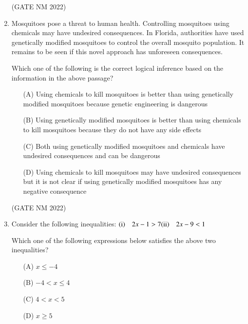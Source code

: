\documentclass[journal,12pt,onecolumn]{IEEEtran}
\theoremstyle{remark}
\begin{document}
\begin{enumerate}
\begin{multicols}{4}
\end{multicols}

\hfill(GATE NM 2022)





\item  Mosquitoes pose a threat to human health. Controlling mosquitoes using chemicals may have undesired consequences. In Florida, authorities have used genetically modified mosquitoes to control the overall mosquito population. It remains to be seen if this novel approach has unforeseen consequences.  

Which one of the following is the correct logical inference based on the information in the above passage?  

\begin{enumerate}
    \item[(A)] Using chemicals to kill mosquitoes is better than using genetically modified mosquitoes because genetic engineering is dangerous
    \item[(B)] Using genetically modified mosquitoes is better than using chemicals to kill mosquitoes because they do not have any side effects
    \item[(C)] Both using genetically modified mosquitoes and chemicals have undesired consequences and can be dangerous
    \item[(D)] Using chemicals to kill mosquitoes may have undesired consequences but it is not clear if using genetically modified mosquitoes has any negative consequence
\end{enumerate}

\hfill(GATE NM 2022)



\item  Consider the following inequalities:  
$	
    \text{(i)} \quad   2x - 1 > 7 \\
 \text{(ii)} \quad   2x - 9 < 1
$

Which one of the following expressions below satisfies the above two inequalities? 

\begin{multicols}{2}

\begin{enumerate}
    \item[(A)] $x \leq -4$
    \item[(B)] $-4 < x \leq 4$
    \item[(C)] $4 < x < 5$
    \item[(D)] $x \geq 5$
\end{enumerate}


\end{multicols}
\end{enumerate}
\end{document}
